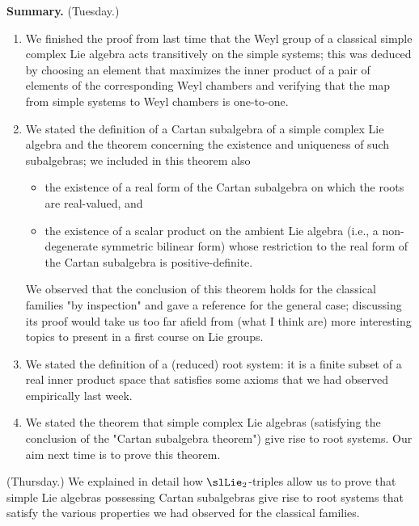 \documentclass[reqno]{amsart} 
\begin{document}
\textbf{Summary.} (Tuesday.) 
\begin{enumerate}
\item We finished the proof from last time that the Weyl group of a
classical simple complex Lie algebra acts transitively on the
simple systems; this was deduced by choosing an element that
maximizes the inner product of a pair of elements of the
corresponding Weyl chambers and verifying that the map from simple
systems to Weyl chambers is one-to-one.
\item We stated the definition of a Cartan subalgebra of a simple complex
Lie algebra and the theorem concerning the existence and uniqueness
of such subalgebras; we included in this theorem also
\begin{itemize}
\item the existence of a real form of the Cartan subalgebra on which
the roots are real-valued, and
\item the existence of a scalar product on the ambient Lie algebra
(i.e., a non-degenerate symmetric bilinear form) whose
restriction to the real form of the Cartan subalgebra is
positive-definite.
\end{itemize}
We observed that the conclusion of this theorem holds for the
classical families "by inspection" and gave a reference for the
general case; discussing its proof would take us too far afield
from (what I think are) more interesting topics to present in a
first course on Lie groups.
\item We stated the definition of a (reduced) root system: it is a finite
subset of a real inner product space that satisfies some axioms
that we had observed empirically last week.
\item We stated the theorem that simple complex Lie algebras (satisfying
the conclusion of the "Cartan subalgebra theorem") give rise to
root systems.  Our aim next time is to prove this theorem.
\end{enumerate}

(Thursday.)
We explained in detail how $\slLie\textsubscript{2}$-triples allow us to prove that
simple Lie algebras possessing Cartan subalgebras give rise to root
systems that satisfy the various properties we had observed for the
classical families.
\end{document}
